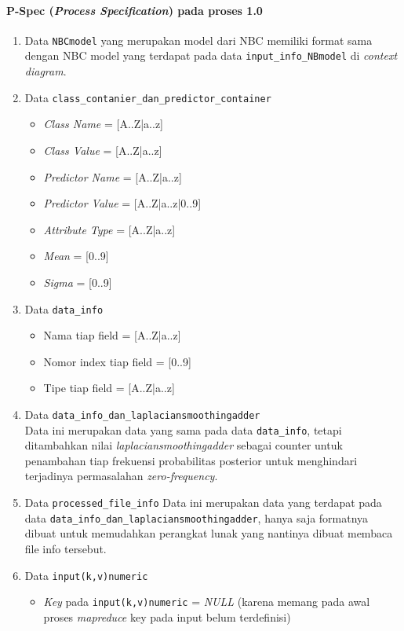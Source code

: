 \paragraph{P-Spec (\textit{Process Specification}) pada proses 1.0}
\begin{enumerate}
	\item{Data \verb|NBCmodel|}
	yang merupakan model dari NBC memiliki format sama dengan NBC model yang terdapat pada data \verb|input_info_NBmodel| di \textit{context diagram}.
	
	\item{Data \verb|class_contanier_dan_predictor_container|}
	\begin{itemize}
		\item \textit{Class Name} = [A..Z|a..z]
		\item \textit{Class Value} = [A..Z|a..z]
		\item \textit{Predictor Name} = [A..Z|a..z]
		\item \textit{Predictor Value} = [A..Z|a..z|0..9]
		\item \textit{Attribute Type} = [A..Z|a..z]
		\item \textit{Mean} = [0..9]
		\item \textit{Sigma} = [0..9]
	\end{itemize}

	\item{Data \verb|data_info|}
	\begin{itemize}
		\item Nama tiap field = [A..Z|a..z]
		\item Nomor index tiap field = [0..9]
		\item Tipe tiap field = [A..Z|a..z]
	\end{itemize}

	\item{Data \verb|data_info_dan_laplaciansmoothingadder|} \\
	Data ini merupakan data yang sama pada data \verb|data_info|, tetapi ditambahkan nilai \textit{laplaciansmoothingadder} sebagai counter untuk penambahan tiap frekuensi probabilitas posterior untuk menghindari terjadinya permasalahan \textit{zero-frequency}.
	
	\item{Data \verb|processed_file_info|}
	Data ini merupakan data yang terdapat pada data \verb|data_info_dan_laplaciansmoothingadder|, hanya saja formatnya dibuat untuk memudahkan perangkat lunak yang nantinya dibuat membaca file info tersebut.

	\item{Data \verb|input(k,v)numeric|}
	\begin{itemize}
		\item \textit{Key} pada \verb|input(k,v)numeric| = \textit{NULL} (karena memang pada awal proses \textit{mapreduce} key pada input belum terdefinisi)


\end{itemize}
\end{enumerate}
